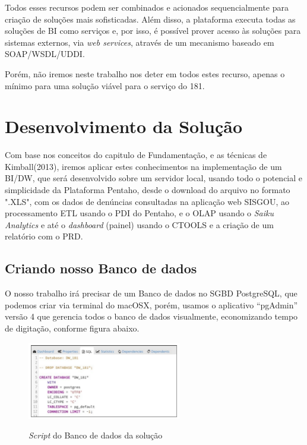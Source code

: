 Todos esses recursos podem ser combinados e acionados sequencialmente para cria\c{c}\~{a}o de solu\c{c}\~{o}es mais sofisticadas. Al\'{e}m disso, a plataforma executa todas as solu\c{c}\~{o}es de BI como servi\c{c}os e, por isso, \'{e} poss\'{i}vel prover acesso \`{a}s solu\c{c}\~{o}es para sistemas externos, via \textit{web services}, atrav\'{e}s de um mecanismo baseado em SOAP/WSDL/UDDI.

Por\'{e}m, n\~{a}o iremos neste trabalho nos deter em todos estes recurso, apenas o m\'{i}nimo para uma solu\c{c}\~{a}o vi\'{a}vel para o servi\c{c}o do 181.


\section{Desenvolvimento da Solu\c{c}\~{a}o}

Com base nos conceitos do capitulo de Fundamenta\c{c}\~{a}o, e as t\'{e}cnicas de Kimball(2013), iremos aplicar estes conhecimentos na implementa\c{c}\~{a}o de um BI/DW, que ser\'{a} desenvolvido sobre um servidor local, usando todo o potencial e simplicidade da Plataforma Pentaho, desde o download do arquivo no formato ".XLS", com os dados de denúncias consultadas na aplica\c{c}\~{a}o web SISGOU, ao processamento ETL usando o PDI do Pentaho, e o OLAP usando o \textit{Saiku Analytics} e at\'{e} o \textit{dashboard} (painel) usando o CTOOLS e a cria\c{c}\~{a}o de um relat\'orio com o PRD.

\subsection{Criando nosso Banco de dados}

O nosso trabalho ir\'{a} precisar de um Banco de dados no SGBD PostgreSQL, que podemos criar via terminal do macOSX, por\'{e}m, usamos o aplicativo ``pgAdmin'' vers\~{a}o 4 que gerencia todos o banco de dados visualmente, economizando tempo de digita\c{c}\~{a}o, conforme figura abaixo.

\begin{figure}[H]
	\vspace*{0,2cm}
    \centering
    \caption{\textit{Script} do Banco de dados da solu\c{c}\~{a}o}
    \includegraphics[width=0.6\textwidth]{./04-figuras/figura-16}
    \label{fig:ilustfig16}
\end{figure}
\vspace*{-0,9cm}
{\raggedright {}} \\

